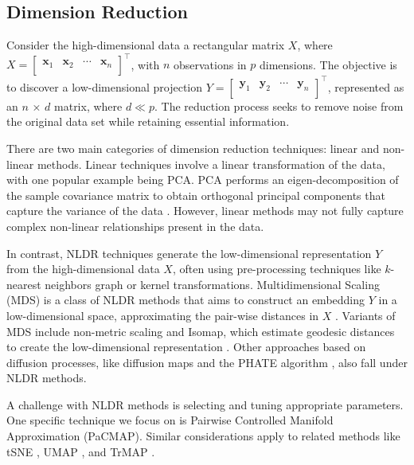 \documentclass[
  12pt]{article}
\begin{document}
\hypertarget{dimension-reduction}{%
\subsection{Dimension Reduction}\label{dimension-reduction}}

Consider the high-dimensional data a rectangular matrix \(X\), where
\(X = \begin{bmatrix} \textbf{x}_{1} & \textbf{x}_{2} & \cdots & \textbf{x}_{n}\\ \end{bmatrix}^\top\),
with \(n\) observations in \(p\) dimensions. The objective is to
discover a low-dimensional projection
\(Y = \begin{bmatrix} \textbf{y}_{1} & \textbf{y}_{2} & \cdots & \textbf{y}_{n}\\ \end{bmatrix}^\top\),
represented as an \(n\) × \(d\) matrix, where \(d \ll p\). The reduction
process seeks to remove noise from the original data set while retaining
essential information.

There are two main categories of dimension reduction techniques: linear
and non-linear methods. Linear techniques involve a linear
transformation of the data, with one popular example being PCA. PCA
performs an eigen-decomposition of the sample covariance matrix to
obtain orthogonal principal components that capture the variance of the
data \citep{Karl1901}. However, linear methods may not fully capture
complex non-linear relationships present in the data.

In contrast, NLDR techniques generate the low-dimensional representation
\(Y\) from the high-dimensional data \(X\), often using pre-processing
techniques like \(k\)-nearest neighbors graph or kernel transformations.
Multidimensional Scaling (MDS) is a class of NLDR methods that aims to
construct an embedding \(Y\) in a low-dimensional space, approximating
the pair-wise distances in \(X\) \citep{Torgerson1967}. Variants of MDS
include non-metric scaling \citep{article62} and Isomap, which estimate
geodesic distances to create the low-dimensional representation
\citep{article63}. Other approaches based on diffusion processes, like
diffusion maps \citep{article64} and the PHATE algorithm
\citep{article03}, also fall under NLDR methods.

A challenge with NLDR methods is selecting and tuning appropriate
parameters. One specific technique we focus on is Pairwise Controlled
Manifold Approximation (PaCMAP). Similar considerations apply to related
methods like tSNE \citep{Laurens2008}, UMAP \citep{Leland2018}, and
TrMAP \citep{article02}.
\end{document}
